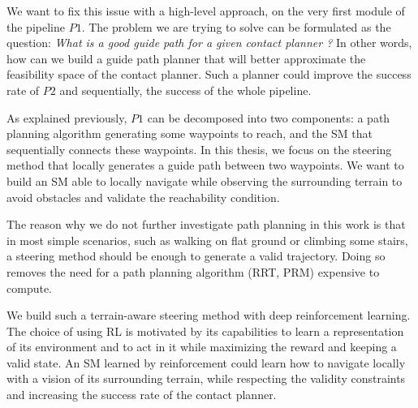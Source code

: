 We want to fix this issue with a high-level approach, on the very first module of the pipeline $P1$.
The problem we are trying to solve can be formulated as the question: \textit{What is a good guide path for a given contact planner ?} 
In other words, how can we build a guide path planner that will better approximate the feasibility space of the contact planner. Such a planner could improve the success rate of $P2$ and sequentially, the success of the whole pipeline.

As explained previously, $P1$ can be decomposed into two components: a path planning algorithm generating some waypoints to reach, and the SM that sequentially connects these waypoints.
In this thesis, we focus on the steering method that locally generates a guide path between two waypoints.
We want to build an SM able to locally navigate while observing the surrounding terrain to avoid obstacles and validate the reachability condition. 

The reason why we do not further investigate path planning in this work is that in most simple scenarios, such as walking on flat ground or climbing some stairs, a steering method should be enough to generate a valid trajectory. Doing so removes the need for a path planning algorithm (RRT, PRM) expensive to compute.

We build such a terrain-aware steering method with deep reinforcement learning.
The choice of using RL is motivated by its capabilities to learn a representation of its environment and to act in it while maximizing the reward and keeping a valid state.
An SM learned by reinforcement could learn how to navigate locally with a vision of its surrounding terrain, while respecting the validity constraints and increasing the success rate of the contact planner.

